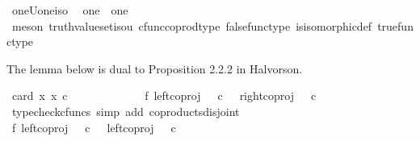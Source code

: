 \begin{isabellebody}
\isamarkupfalse%
%
\endisatagproof
{\isafoldproof}%
%
\isadelimproof
\isanewline
%
\endisadelimproof
\isanewline
{}\isamarkupfalse%
\ oneUone{\isacharunderscore}{\kern0pt}iso{\isacharunderscore}{\kern0pt}{\isasymOmega}{\isacharcolon}{\kern0pt}\isanewline
\ \ {\isachardoublequoteopen}one\ {\isasymCoprod}\ one\ {\isasymcong}\ {\isasymOmega}{\isachardoublequoteclose}\isanewline
%
\isadelimproof
\ \ %
\endisadelimproof
%
\isatagproof
{}\isamarkupfalse%
\ {\isacharparenleft}{\kern0pt}meson\ truth{\isacharunderscore}{\kern0pt}value{\isacharunderscore}{\kern0pt}set{\isacharunderscore}{\kern0pt}iso{\isacharunderscore}{\kern0pt}{}u{}\ cfunc{\isacharunderscore}{\kern0pt}coprod{\isacharunderscore}{\kern0pt}type\ false{\isacharunderscore}{\kern0pt}func{\isacharunderscore}{\kern0pt}type\ is{\isacharunderscore}{\kern0pt}isomorphic{\isacharunderscore}{\kern0pt}def\ true{\isacharunderscore}{\kern0pt}func{\isacharunderscore}{\kern0pt}type{\isacharparenright}{\kern0pt}%
\endisatagproof
{\isafoldproof}%
%
\isadelimproof
%
\endisadelimproof
%
\begin{isamarkuptext}%
The lemma below is dual to Proposition 2.2.2 in Halvorson.%
\end{isamarkuptext}\isamarkuptrue%
\isamarkupfalse%
\ {\isachardoublequoteopen}card\ {\isacharbraceleft}{\kern0pt}x{\isachardot}{\kern0pt}\ x\ {\isasymin}\isactrlsub c\ {\isasymOmega}\ {\isasymCoprod}\ {\isasymOmega}{\isacharbraceright}{\kern0pt}\ {\isacharequal}{\kern0pt}\ {}{\isachardoublequoteclose}\isanewline
%
\isadelimproof
%
\endisadelimproof
%
\isatagproof
{}\isamarkupfalse%
\ {\isacharminus}{\kern0pt}\isanewline
\ \ \isanewline
\ \ \isamarkupfalse%
\ f{}{\isacharcolon}{\kern0pt}\ {\isachardoublequoteopen}{\isacharparenleft}{\kern0pt}left{\isacharunderscore}{\kern0pt}coproj\ {\isasymOmega}\ {\isasymOmega}{\isacharparenright}{\kern0pt}\ {\isasymcirc}\isactrlsub c\ {\isasymt}\ {\isasymnoteq}\ {\isacharparenleft}{\kern0pt}right{\isacharunderscore}{\kern0pt}coproj\ {\isasymOmega}\ {\isasymOmega}{\isacharparenright}{\kern0pt}\ {\isasymcirc}\isactrlsub c\ {\isasymt}{\isachardoublequoteclose}\isanewline
\ \ \ \ \isamarkupfalse%
\ {\isacharparenleft}{\kern0pt}typecheck{\isacharunderscore}{\kern0pt}cfuncs{\isacharcomma}{\kern0pt}\ simp\ add{\isacharcolon}{\kern0pt}\ coproducts{\isacharunderscore}{\kern0pt}disjoint{\isacharparenright}{\kern0pt}\isanewline
\ \ \isamarkupfalse%
\ f{}{\isacharcolon}{\kern0pt}\ {\isachardoublequoteopen}{\isacharparenleft}{\kern0pt}left{\isacharunderscore}{\kern0pt}coproj\ {\isasymOmega}\ {\isasymOmega}{\isacharparenright}{\kern0pt}\ {\isasymcirc}\isactrlsub c\ {\isasymt}\ {\isasymnoteq}\ {\isacharparenleft}{\kern0pt}left{\isacharunderscore}{\kern0pt}coproj\ {\isasymOmega}\ {\isasymOmega}{\isacharparenright}{\kern0pt}\ {\isasymcirc}\isactrlsub c\ {\isasymf}{\isachardoublequoteclose}\isanewline

\end{isabellebody}
